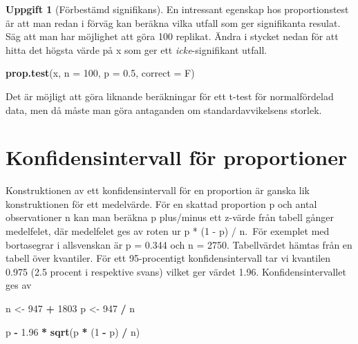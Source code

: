 \documentclass[
]{book}
\newenvironment{Shaded}{\begin{snugshade}}{\end{snugshade}}
\newcommand{\AttributeTok}[1]{\textcolor[rgb]{0.13,0.29,0.53}{#1}}
\newcommand{\DecValTok}[1]{\textcolor[rgb]{0.00,0.00,0.81}{#1}}
\newcommand{\FloatTok}[1]{\textcolor[rgb]{0.00,0.00,0.81}{#1}}
\newcommand{\FunctionTok}[1]{\textcolor[rgb]{0.13,0.29,0.53}{\textbf{#1}}}
\newcommand{\NormalTok}[1]{#1}
\newcommand{\OtherTok}[1]{\textcolor[rgb]{0.56,0.35,0.01}{#1}}
\newcommand{\SpecialCharTok}[1]{\textcolor[rgb]{0.81,0.36,0.00}{\textbf{#1}}}
\theoremstyle{definition}
\theoremstyle{definition}
\theoremstyle{definition}
\newtheorem{exercise}{Uppgift}[chapter]
\theoremstyle{definition}
\theoremstyle{remark}
\begin{document}
\begin{exercise}[Förbestämd signifikans]
En intressant egenskap hos proportionstest är att man redan i förväg kan beräkna vilka utfall som ger signifikanta resulat. Säg att man har möjlighet att göra 100 replikat. Ändra i stycket nedan för att hitta det högsta värde på x som ger ett \emph{icke}-signifikant utfall.

\begin{Shaded}
\begin{Highlighting}[]
\FunctionTok{prop.test}\NormalTok{(x, }\AttributeTok{n =} \DecValTok{100}\NormalTok{, }\AttributeTok{p =} \FloatTok{0.5}\NormalTok{, }\AttributeTok{correct =}\NormalTok{ F)}
\end{Highlighting}
\end{Shaded}

Det är möjligt att göra liknande beräkningar för ett t-test för normalfördelad data, men då måste man göra antaganden om standardavvikelsens storlek.
\end{exercise}

\hypertarget{konfidensintervall-fuxf6r-proportioner}{%
\section{Konfidensintervall för proportioner}\label{konfidensintervall-fuxf6r-proportioner}}

Konstruktionen av ett konfidensintervall för en proportion är ganska lik konstruktionen för ett medelvärde. För en skattad proportion p och antal observationer n kan man beräkna p plus/minus ett z-värde från tabell gånger medelfelet, där medelfelet ges av roten ur p * (1 - p) / n.~För exemplet med bortasegrar i allsvenskan är p = 0.344 och n = 2750. Tabellvärdet hämtas från en tabell över kvantiler. För ett 95-procentigt konfidensintervall tar vi kvantilen 0.975 (2.5 procent i respektive svans) vilket ger värdet 1.96. Konfidensintervallet ges av

\begin{Shaded}
\begin{Highlighting}[]
\NormalTok{n }\OtherTok{\textless{}{-}} \DecValTok{947} \SpecialCharTok{+} \DecValTok{1803}
\NormalTok{p }\OtherTok{\textless{}{-}} \DecValTok{947} \SpecialCharTok{/}\NormalTok{ n}

\NormalTok{p }\SpecialCharTok{{-}} \FloatTok{1.96} \SpecialCharTok{*} \FunctionTok{sqrt}\NormalTok{(p }\SpecialCharTok{*}\NormalTok{ (}\DecValTok{1} \SpecialCharTok{{-}}\NormalTok{ p) }\SpecialCharTok{/}\NormalTok{ n)}
\end{Highlighting}
\end{Shaded}
\end{document}
